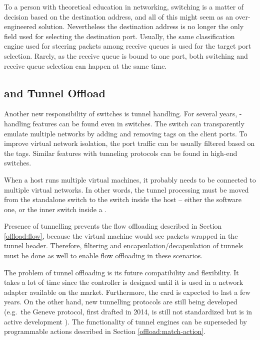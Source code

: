 To a person with theoretical education in networking, switching is a matter of
decision based on the destination  address, and all of this might seem
as an over-engineered solution. Nevertheless the destination  address is no
longer the only field used for selecting the destination port. Usually, the same
classification engine used for steering packets among receive queues is used
for the target port selection. Rarely, as the receive queue is bound to one
port, both switching and receive queue selection can happen at the same time.

\subsection{ and Tunnel Offload}

Another new responsibility of switches is tunnel handling. For several years, -handling
features can be found even in  switches. The switch can
transparently emulate multiple networks by adding and removing  tags on
the client ports. To improve virtual network isolation, the port traffic
can be usually filtered based on the  tags. Similar features with
tunneling protocols can be found in high-end switches.

When a host runs multiple virtual machines, it probably needs to be connected
to multiple virtual networks. In other words, the tunnel processing must be
moved from the standalone switch to the switch inside the host -- either the
software one, or the inner switch inside a .

Presence of tunnelling prevents the flow offloading described in Section \ref{offload:flow},
because the virtual machine would see packets wrapped in the tunnel header.
Therefore, filtering and encapsulation/decapsulation of
tunnels must be done as well to enable flow offloading in these scenarios.

The problem of tunnel offloading is its future compatibility and flexibility.
It takes a lot of time since the controller is designed until it is used in
a network adapter available on the market. Furthermore, the card is expected to
last a few years. On the other hand, new tunnelling protocols are still being
developed (e.g.\ the Geneve protocol, first drafted in 2014, is still not
standardized but is in active development \cite{ietf-nvo3-geneve-06}). The
functionality of tunnel engines can be superseded by programmable actions
described in Section \ref{offload:match-action}.

